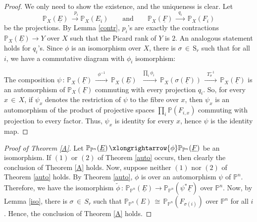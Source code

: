 \documentclass[12pt,reqno]{amsart}
\theoremstyle{definition}
\numberwithin{equation}{section}
\begin{document}
\begin{proof}
We only need to show the existence, and the uniqueness is clear.    Let 
\begin{equation*}
\mathbb{P}_{X}(\underline{E})\,\xrightarrow{\,\,\,p_{i}}\mathbb{P}_{X}(E_{i}) \qquad \textrm{and} \qquad  \mathbb{P}_{X}(\underline{F})\,\xrightarrow{\,\,\,q_{i}\,\,\,}\,\mathbb{P}_{X}(F_{i}) 
\end{equation*}
be the projections. By Lemma \ref{contr}, $p_{i}$'s are exactly the contractions $\mathbb{P}_{X}(\underline{E})\to Y$ over $X$ such that the Picard rank of $Y$ is $ 2.$ An analogous statement holds for $q_{i}$'s. Since $\phi$ is an isomorphism over $X$, there is $\sigma\,\in\, \textrm{S}_{r}$ such that for all $i$, we have a commutative diagram with $\phi_{i}$ isomorphism:
\begin{center}
\end{center}
The composition $\psi\,:\,\mathbb{P}_{X}(\underline{F})\,\xrightarrow{\,\,\,\phi^{-1}\,\,\,}\, \mathbb{P}_{X}(\underline{E})\,\xrightarrow{\,\,\,\prod_i \phi_i\,\,\,}\, \mathbb{P}_{X}(\sigma(\underline{F}))\,\xrightarrow{\,\,\,T_{\sigma}^{-1}\,\,\,}\, \mathbb{P}_{X}(\underline{F})$ is an automorphism of $\mathbb{P}_{X}(\underline{F})$ commuting with every projection $q_i$. So, for every $x\,\in\, X$, if $\psi_x$ denotes the restriction of $\psi$ to the fibre over $x$, then $\psi_x$ is an automorphism of the product of projective spaces $\prod_i \mathbb{P}(F_{i,x})$ commuting with projection to every factor. Thus, $\psi_x$ is identity for every $x$, hence $\psi$ is the identity map.
\end{proof}
\begin{proof}[Proof of Theorem \ref{A}]
Let $\mathbb{P}_{\mathbb{P}^{n}}(\underline{E})\,\xlongrightarrow{\phi}\mathbb{P}_{\mathbb{P}^{n}}(\underline{F})$ be an isomorphism. If $(1)$ or $(2)$ of Theorem \ref{auto} occurs, then clearly the conclusion of Theorem \ref{A} holds. Now, suppose neither $(1)$ nor $(2)$ of Theorem \ref{auto} holds. By Theorem \ref{auto}, $\phi$  is over an automorphism $\psi$ of $\mathbb{P}^{n}$. Therefore, we have the isomorphism $\tilde{\phi}\,:\, \mathbb{P}_{\mathbb{P}^{n}}(\underline{E})\to \mathbb{P}_{\mathbb{P}^{n}}(\psi^*\underline{F})$ over $\mathbb{P}^{n}$. Now, by Lemma \ref{iso}, there is $\sigma\,\in\, S_r$ such that $\mathbb{P}_{\mathbb{P}^{n}}(E)\,\cong\, \mathbb{P}_{\mathbb{P}^{n}}(F_{\sigma(i)})$ over $\mathbb{P}^n$ for all $i$. Hence, the conclusion of Theorem \ref{A} holds.
\end{proof}
        
\end{document}

